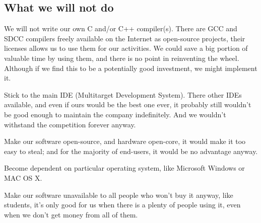 \documentclass[a4paper,twoside,15pt]{book}
\begin{document}
        \subsection{What we will not do}
            \begin{dinglist}{73}
                \item We will not write our own C and/or C++ compiler(s). There are GCC and SDCC compilers freely available on the Internet as open-source projects, their licenses allows us to use them for our activities. We could save a big portion of valuable time by using them, and there is no point in reinventing the wheel. Although if we find this to be a potentially good investment, we might implement it.
                \item Stick to the main IDE (Multitarget Development System). There other IDEs available, and even if ours would be the best one ever, it probably still wouldn't be good enough to maintain the company indefinitely. And we wouldn't withstand the competition forever anyway.
                \item Make our software open-source, and hardware open-core, it would make it too easy to steal; and for the majority of end-users, it would be no advantage anyway.
                \item Become dependent on particular operating system, like Microsoft Windows or MAC OS X.
                \item Make our software unavailable to all people who won't buy it anyway, like students, it's only good for us when there is a plenty of people using it, even when we don't get money from all of them.
            \end{dinglist}
\end{document}
